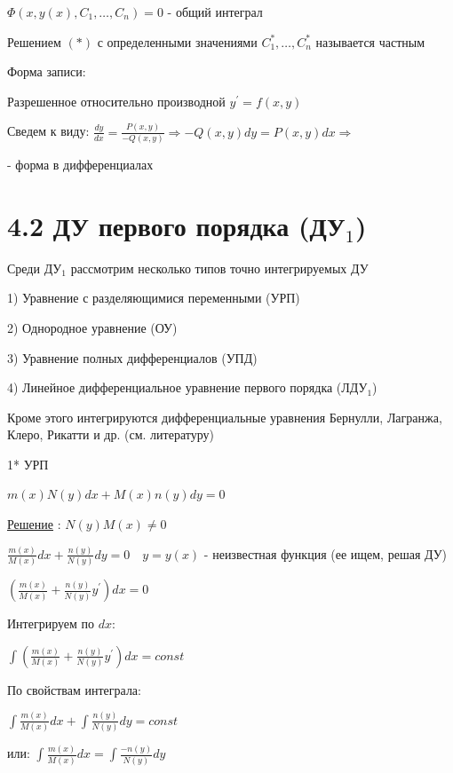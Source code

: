 \documentclass[12pt]{article}
\begin{document}
    \Nota $\displaystyle \Phi(x, y(x), C_1, \dots, C_n) = 0$ - общий интеграл

     Решением $(*)$ с определенными значениями $\displaystyle C_1^*, \dots, C_n^*$ называется частным

    \Nota Форма записи:

    Разрешенное относительно производной $\displaystyle y^\prime = f(x, y)$

    Сведем к виду: $\displaystyle \frac{dy}{dx} = \frac{P(x, y)}{-Q(x, y)} \Longrightarrow -Q(x, y)dy = P(x, y)dx \Longrightarrow $

     - форма в дифференциалах



    \section{4.2 ДУ первого порядка (ДУ$\displaystyle _1$)}

    \Nota Среди ДУ$\displaystyle _1$ рассмотрим несколько типов точно интегрируемых ДУ

    1) Уравнение с разделяющимися переменными (УРП)

    2) Однородное уравнение (ОУ)

    3) Уравнение полных дифференциалов (УПД)

    4) Линейное дифференциальное уравнение первого порядка (ЛДУ$\displaystyle _1$)

    Кроме этого интегрируются дифференциальные уравнения Бернулли, Лагранжа, Клеро, Рикатти и др. (см. литературу)

    1* УРП

    \Def $m(x)N(y)dx + M(x)n(y)dy = 0$

    \underline{Решение} : $N(y)M(x) \neq 0$

    $\displaystyle \frac{m(x)}{M(x)}dx + \frac{n(y)}{N(y)}dy = 0 \quad y = y(x)$ - неизвестная функция (ее ищем, решая ДУ)

    $\displaystyle (\frac{m(x)}{M(x)} + \frac{n(y)}{N(y)}y^\prime)dx = 0$

    Интегрируем по $dx$:

    $\displaystyle \int \left(\frac{m(x)}{M(x)} + \frac{n(y)}{N(y)}y^\prime\right)dx = const$

    По свойствам интеграла:

    $\displaystyle \int \frac{m(x)}{M(x)}dx + \int\frac{n(y)}{N(y)}dy = const$

    или: $\displaystyle \int \frac{m(x)}{M(x)}dx = \int\frac{-n(y)}{N(y)}dy$
\end{document}
